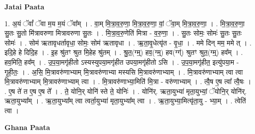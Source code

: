 \documentclass[17pt]{extarticle}
\begin{document}
\textbf{Jatai Paata} \newline

1. अ॒यं ॅवां᳚ ॅवा म॒य म॒यं ॅवा᳚म् । . वा॒म् मि॒त्रा॒व॒रु॒णा॒ मि॒त्रा॒व॒रु॒णा॒ वां॒ ॅवा॒म् मि॒त्रा॒व॒रु॒णा॒ । . मि॒त्रा॒व॒रु॒णा॒ सु॒तः सु॒तो मि॑त्रावरुणा मित्रावरुणा सु॒तः । . मि॒त्रा॒व॒रु॒णेति॑ मित्रा - व॒रु॒णा॒ । . सु॒तः सोमः॒ सोमः॑ सु॒तः सु॒तः सोमः॑ । . सोम॑ ऋतावृधर्तावृधा॒ सोमः॒ सोम॑ ऋतावृधा । . ऋ॒ता॒वृ॒धेत्यृ॑त - वृ॒धा॒ । . ममे दिन् मम॒ ममे त् । . इदि॒हे हे दिदि॒ह । . इ॒ह श्रु॑तꣳ श्रुत मि॒हेह श्रु॑तम् । . श्रु॒त॒(ग्म्॒) हव॒(ग्म्॒) हव(ग्ग्॑) श्रुतꣳ श्रुत॒(ग्म्॒) हव᳚म् । . हव॒मिति॒ हव᳚म् । . उ॒प॒या॒मगृ॑हीतो ऽस्यस्युपया॒मगृ॑हीत उपया॒मगृ॑हीतो ऽसि । . उ॒प॒या॒मगृ॑हीत॒ इत्यु॑पया॒म - गृ॒ही॒तः॒ । . अ॒सि॒ मि॒त्रावरु॑णाभ्याम् मि॒त्रावरु॑णाभ्या मस्यसि मि॒त्रावरु॑णाभ्याम् । . मि॒त्रावरु॑णाभ्याम् त्वा त्वा मि॒त्रावरु॑णाभ्याम् मि॒त्रावरु॑णाभ्याम् त्वा । . मि॒त्रावरु॑णाभ्या॒मिति॑ मि॒त्रा - वरु॑णाभ्याम् । . त्वै॒ष ए॒ष त्वा᳚ त्वै॒षः । . ए॒ष ते॑ त ए॒ष ए॒ष ते᳚ । . ते॒ योनि॒र् योनि॑ स्ते ते॒ योनिः॑ । . योनि॑र्. ऋता॒युभ्या॑ मृता॒युभ्यां॒ ॅयोनि॒र् योनि॑र्. ऋता॒युभ्या᳚म् । . ऋ॒ता॒युभ्या᳚म् त्वा त्वर्ता॒युभ्या॑ मृता॒युभ्या᳚म् त्वा । . ऋ॒ता॒युभ्या॒मित्यृ॑ता॒यु - भ्या॒म् । . त्वेति॑ त्वा । \newline

\textbf{Ghana Paata } \newline
\end{document}
